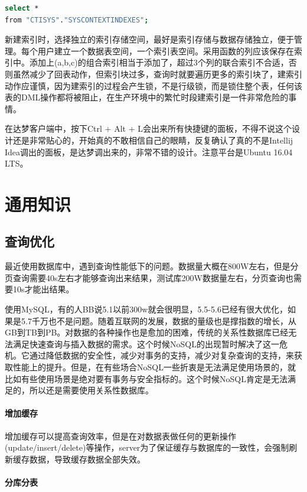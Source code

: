 \documentclass[letter]{book}
\begin{document}
\begin{lstlisting}[language=Bash]
select * 
from "CTISYS"."SYSCONTEXTINDEXES";
\end{lstlisting}

新建索引时，选择独立的索引存储空间，最好是索引存储与数据存储独立，便于管理。每个用户建立一个数据表空间，一个索引表空间。采用函数的列应该保存在索引中。添加上(a,b,c)的组合索引相当于添加了，超过3个列的联合索引不合适，否则虽然减少了回表动作，但索引块过多，查询时就要遍历更多的索引块了，建索引动作应谨慎，因为建索引的过程会产生锁，不是行级锁，而是锁住整个表，任何该表的DML操作都将被阻止，在生产环境中的繁忙时段建索引是一件非常危险的事情。

在达梦客户端中，按下Ctrl + Alt + L会出来所有快捷键的面板，不得不说这个设计还是非常贴心的，开始真的不敢相信自己的眼睛，反复确认了真的不是Intellij Idea调出的面板，是达梦调出来的，非常不错的设计。注意平台是Ubuntu 16.04 LTS。

\section{通用知识}

\subsection{查询优化}

最近使用数据库中，遇到查询性能低下的问题。数据量大概在800W左右，但是分页查询需要40s左右才能够查询出来结果，测试库200W数据量左右，分页查询也需要10s才能出结果。

使用MySQL，有的人BB说5.1以前300w就会很明显，5.5-5.6已经有很大优化，如果是5.7千万也不是问题。随着互联网的发展，数据的量级也是撑指数的增长，从GB到TB到PB。对数据的各种操作也是愈加的困难，传统的关系性数据库已经无法满足快速查询与插入数据的需求。这个时候NoSQL的出现暂时解决了这一危机。它通过降低数据的安全性，减少对事务的支持，减少对复杂查询的支持，来获取性能上的提升。但是，在有些场合NoSQL一些折衷是无法满足使用场景的，就比如有些使用场景是绝对要有事务与安全指标的。这个时候NoSQL肯定是无法满足的，所以还是需要使用关系性数据库。

\paragraph{增加缓存}增加缓存可以提高查询效率，但是在对数据表做任何的更新操作(update/insert/delete)等操作，server为了保证缓存与数据库的一致性，会强制刷新缓存数据，导致缓存数据全部失效。

\paragraph{分库分表}
\end{document}
